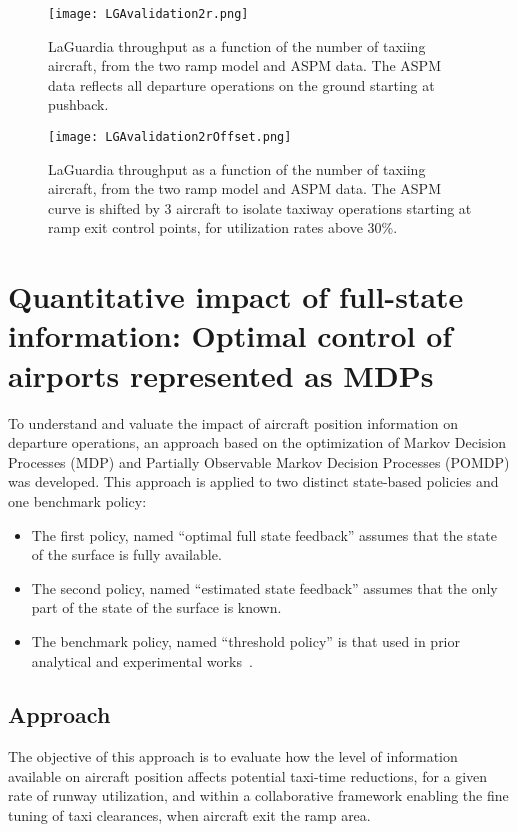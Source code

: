 \documentclass[letterpaper]{article}
\begin{document}
\begin{figure}[ht]
\centering
\texttt{[image: LGAvalidation2r.png]}
\caption{LaGuardia throughput as a function of the number of taxiing aircraft, from the two ramp model and ASPM data. The ASPM data reflects all departure operations on the ground starting at pushback.}
\label{loadGraph21}
\end{figure}


\begin{figure}[ht]
\centering
\texttt{[image: LGAvalidation2rOffset.png]}
\caption{LaGuardia throughput as a function of the number of taxiing aircraft, from the two ramp model and ASPM data. The ASPM curve is shifted by 3 aircraft to isolate taxiway operations starting at ramp exit control points, for utilization rates above 30\%.}
\label{loadGraph22}
\end{figure}

\section{Quantitative impact of full-state information: Optimal control of airports represented as MDPs}
\label{quantitative}

To understand and valuate the impact of aircraft position information on departure operations, an approach based on the optimization of Markov Decision Processes (MDP) and Partially Observable Markov Decision Processes (POMDP) was developed. This approach is applied to two distinct state-based policies and one benchmark policy:
\begin{itemize}
\item The first policy, named ``optimal full state feedback'' assumes that the state of the surface is fully available.
\item The second policy, named ``estimated state feedback'' assumes that the only part of the state of the surface is known.
\item The benchmark policy, named ``threshold policy'' is that used in prior analytical and experimental works~\cite{log99,SKB:11}.
\end{itemize}

\subsection{Approach} \label{theappraoch}


The objective of this approach is to evaluate how the level of information available on aircraft position affects potential taxi-time reductions, for a given rate of runway utilization, and within a collaborative framework enabling the fine tuning of taxi clearances, when aircraft exit the ramp area.
\end{document}

